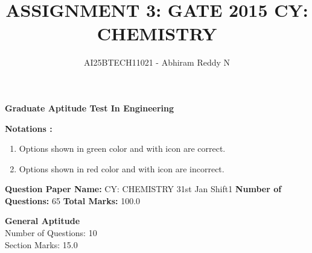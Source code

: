 \documentclass[journal,12pt,onecolumn]{exam}
\theoremstyle{remark}
\newcommand{\cross}{\textcolor{wrongred}{\ding{55}}}
\newcommand{\tick}{\textcolor{correctgreen}{\ding{51}}}
\begin{document}
\title{
ASSIGNMENT 3: GATE 2015 
CY: CHEMISTRY}
\author{AI25BTECH11021 - Abhiram Reddy N}
\maketitle


\begin{center}
    \Large{\textbf{Graduate Aptitude Test In Engineering}}
\end{center}

\textbf{Notations :}

\begin{enumerate}
    \item Options shown in \textcolor{correctgreen}{green} color and with \tick{} icon are correct.
    \item Options shown in \textcolor{wrongred}{red} color and with \cross{} icon are incorrect.
\end{enumerate}

 

\textbf{Question Paper Name:} CY: CHEMISTRY 31st Jan Shift1 
\textbf{Number of Questions:} 65 
\textbf{Total Marks:} 100.0

 


 

\begin{center}
\textbf{General Aptitude} \\
Number of Questions: 10 \\
Section Marks: 15.0
\end{center}

 

\end{document}
